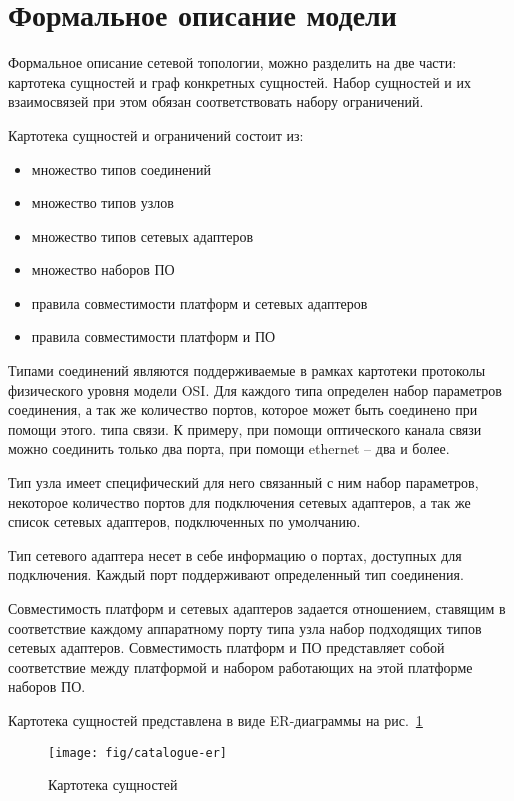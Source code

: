 \section{Формальное описание модели}

Формальное описание сетевой топологии, можно разделить на две части:
картотека сущностей и граф конкретных сущностей. 
Набор сущностей и их взаимосвязей при этом обязан соответствовать набору ограничений.

Картотека сущностей и ограничений состоит из:
\begin{itemize}
    \item множество типов соединений
    \item множество типов узлов
    \item множество типов сетевых адаптеров
    \item множество наборов ПО
    \item правила совместимости платформ и сетевых адаптеров
    \item правила совместимости платформ и ПО
\end{itemize}

Типами соединений являются поддерживаемые в рамках картотеки
протоколы физического уровня модели OSI. Для каждого типа определен набор параметров
соединения, а так же количество портов, которое может быть соединено при помощи этого.
типа связи. К примеру, при помощи оптического канала связи можно соединить только два порта,
при помощи ethernet -- два и более. 

Тип узла имеет специфический для него связанный с ним набор параметров,
некоторое количество портов для подключения сетевых адаптеров, 
а так же список сетевых адаптеров, подключенных по умолчанию.

Тип сетевого адаптера несет в себе информацию о портах, доступных для подключения. 
Каждый порт поддерживают определенный тип соединения.

Совместимость платформ и сетевых адаптеров задается отношением, ставящим в соответствие 
каждому аппаратному порту типа узла набор подходящих типов сетевых адаптеров.
Совместимость платформ и ПО представляет собой соответствие между платформой и набором
работающих на этой платформе наборов ПО.

Картотека сущностей представлена в виде ER-диаграммы на рис.~\ref{fig:catalogue-er}
\begin{figure}
  \centering
  {\texttt{[image: fig/catalogue-er]}}
  \caption{Картотека сущностей}
  \label{fig:catalogue-er}
\end{figure} 


